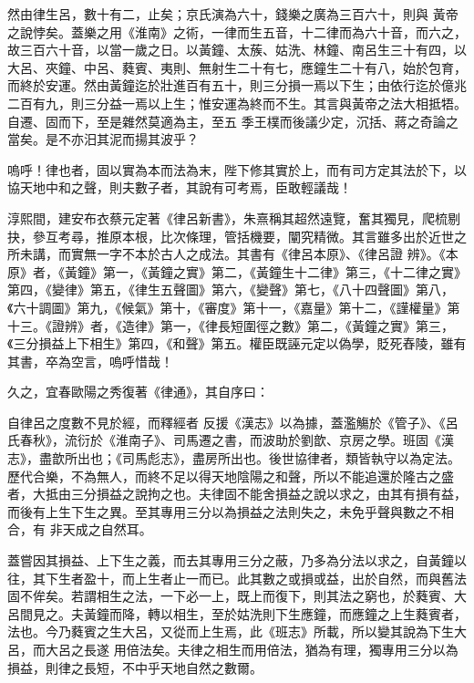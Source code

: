 \begin{pinyinscope}
 然由律生呂，數十有二，止矣；京氏演為六十，錢樂之廣為三百六十，則與
 黃帝之說悖矣。蓋樂之用《淮南》之術，一律而生五音，十二律而為六十音，而六之，故三百六十音，以當一歲之日。以黃鐘、太蔟、姑洗、林鐘、南呂生三十有四，以大呂、夾鐘、中呂、蕤賓、夷則、無射生二十有七，應鐘生二十有八，始於包育，而終於安運。然由黃鐘迄於壯進百有五十，則三分損一焉以下生；由依行迄於億兆二百有九，則三分益一焉以上生；惟安運為終而不生。其言與黃帝之法大相抵牾。自遷、固而下，至是雜然莫適為主，至五
 季王樸而後議少定，沉括、蔣之奇論之當矣。是不亦汨其泥而揚其波乎？



 嗚呼！律也者，固以實為本而法為末，陛下修其實於上，而有司方定其法於下，以協天地中和之聲，則夫數子者，其說有可考焉，臣敢輕議哉！



 淳熙間，建安布衣蔡元定著《律呂新書》，朱熹稱其超然遠覽，奮其獨見，爬梳剔抉，參互考尋，推原本根，比次條理，管括機要，闡究精微。其言雖多出於近世之所未講，而實無一字不本於古人之成法。其書有《律呂本原》、《律呂證
 辨》。《本原》者，《黃鐘》第一，《黃鐘之實》第二，《黃鐘生十二律》第三，《十二律之實》第四，《變律》第五，《律生五聲圖》第六，《變聲》第七，《八十四聲圖》第八，《六十調圖》第九，《候氣》第十，《審度》第十一，《嘉量》第十二，《謹權量》第十三。《證辨》者，《造律》第一，《律長短圍徑之數》第二，《黃鐘之實》第三，《三分損益上下相生》第四，《和聲》第五。權臣既誣元定以偽學，貶死舂陵，雖有其書，卒為空言，嗚呼惜哉！



 久之，宜春歐陽之秀復著《律通》，其自序曰：



 自律呂之度數不見於經，而釋經者
 反援《漢志》以為據，蓋濫觴於《管子》、《呂氏春秋》，流衍於《淮南子》、司馬遷之書，而波助於劉歆、京房之學。班固《漢志》，盡歆所出也；《司馬彪志》，盡房所出也。後世協律者，類皆執守以為定法。歷代合樂，不為無人，而終不足以得天地陰陽之和聲，所以不能追還於隆古之盛者，大抵由三分損益之說拘之也。夫律固不能舍損益之說以求之，由其有損有益，而後有上生下生之異。至其專用三分以為損益之法則失之，未免乎聲與數之不相合，有
 非天成之自然耳。



 蓋嘗因其損益、上下生之義，而去其專用三分之蔽，乃多為分法以求之，自黃鐘以往，其下生者盈十，而上生者止一而已。此其數之或損或益，出於自然，而與舊法固不侔矣。若謂相生之法，一下必一上，既上而復下，則其法之窮也，於蕤賓、大呂間見之。夫黃鐘而降，轉以相生，至於姑洗則下生應鐘，而應鐘之上生蕤賓者，法也。今乃蕤賓之生大呂，又從而上生焉，此《班志》所載，所以變其說為下生大呂，而大呂之長遂
 用倍法矣。夫律之相生而用倍法，猶為有理，獨專用三分以為損益，則律之長短，不中乎天地自然之數爾。




\end{pinyinscope}

